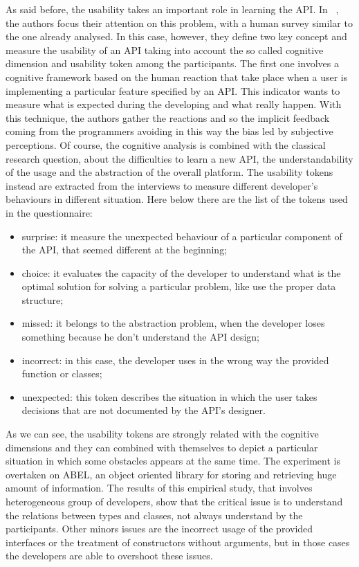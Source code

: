As said before, the usability takes an important role in learning the API. In ~\cite{marco_piccioni_empirical_2013}, the authors focus their attention on this problem, with a human survey similar to the one already analysed. In this case, however, they define two key concept and measure the usability of an API taking into account the so called cognitive dimension and usability token among the participants. The first one involves a cognitive framework based on the human reaction that take place when a user is implementing a particular feature specified by an API. This indicator wants to measure what is expected during the developing and what really happen. With this technique, the authors gather the reactions and so the implicit feedback coming from the programmers avoiding in this way the bias led by subjective perceptions. Of course, the cognitive analysis is combined with the classical research question, about the difficulties to learn a new API, the understandability of the usage and the abstraction of the overall platform. The usability tokens instead are extracted from the interviews to measure different developer's behaviours in different situation. Here below there are the list of the tokens used in the questionnaire:
\begin{itemize}
\item surprise: it measure the unexpected behaviour of a particular component of the API, that seemed different at the beginning;
\item choice: it evaluates the capacity of the developer to understand what is the optimal solution for solving a particular problem, like use the proper data structure;
\item missed: it belongs to the abstraction problem, when the developer loses something because he don't understand the API design;
\item incorrect: in this case, the developer uses in the wrong way the provided function or classes;
\item unexpected: this token describes the situation in which the user takes decisions that are not documented by the API's designer.
\end{itemize}
As we can see, the usability tokens are strongly related with the cognitive dimensions and they can combined with themselves to depict a particular situation in which some obstacles appears at the same time. The experiment is overtaken on ABEL, an object oriented library for storing and retrieving huge amount of information. The results of this empirical study, that involves heterogeneous group of developers, show that the critical issue is to understand the relations between types and classes, not always understand by the participants. Other minors issues are the incorrect usage of the provided interfaces or the treatment of constructors without arguments, but in those cases the developers are able to overshoot these issues. 
